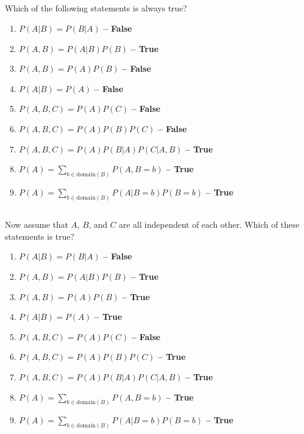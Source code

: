 \documentclass[11pt,letterpaper]{article}
\theoremstyle{definition}
\begin{document}

\subsection{}
Which of the following statements is always true?

\begin{enumerate}
\item $P(A|B) = P(B|A)$ \textbf{ -- False}
\item $P(A,B) = P(A|B) P(B)$ \textbf{ -- True}
\item $P(A,B) = P(A) P(B)$ \textbf{ -- False}
\item $P(A|B) = P(A)$ \textbf{ -- False}
\item $P(A,B,C) = P(A) P(C)$ \textbf{ -- False}
\item $P(A,B,C) = P(A) P(B) P(C)$ \textbf{ -- False}
\item $P(A,B,C) = P(A) P(B|A) P(C|A,B)$ \textbf{ -- True}
\item $P(A) = \sum_{b \in \text{domain}(B)} P(A, B=b)$ \textbf{ -- True}
\item $P(A) = \sum_{b \in \text{domain}(B)} P(A | B=b) P(B=b)$ \textbf{ -- True}
\end{enumerate}

\subsection{}
Now assume that $A$, $B$, and $C$ are all independent of each other.
Which of these statements is true?
\begin{enumerate}
\item $P(A|B) = P(B|A)$ \textbf{ -- False}
\item $P(A,B) = P(A|B) P(B)$ \textbf{ -- True}
\item $P(A,B) = P(A) P(B)$ \textbf{ -- True}
\item $P(A|B) = P(A)$ \textbf{ -- True}
\item $P(A,B,C) = P(A) P(C)$ \textbf{ -- False}
\item $P(A,B,C) = P(A) P(B) P(C)$ \textbf{ -- True}
\item $P(A,B,C) = P(A) P(B|A) P(C|A,B)$ \textbf{ -- True}
\item $P(A) = \sum_{b \in \text{domain}(B)} P(A, B=b)$ \textbf{ -- True}
\item $P(A) = \sum_{b \in \text{domain}(B)} P(A | B=b) P(B=b)$ \textbf{ -- True}
\end{enumerate}
\end{document}
